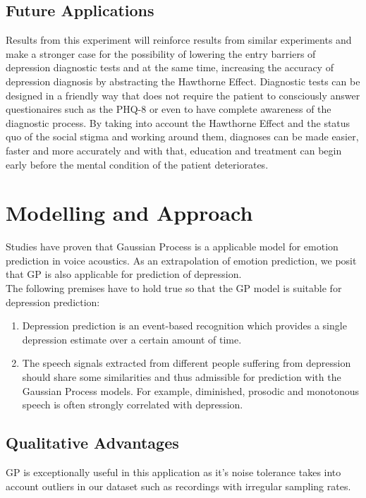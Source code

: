 \documentclass{article}
\begin{document}
	\subsection{Future Applications}
	Results from this experiment will reinforce results from similar experiments and make a stronger case for the possibility of lowering the entry barriers of depression diagnostic tests and at the same time, increasing the accuracy of depression diagnosis by abstracting the Hawthorne Effect. 
	Diagnostic tests can be designed in a friendly way that does not require the patient to consciously answer questionaires such as the PHQ-8 or even to have complete awareness of the diagnostic process. 
	By taking into account the Hawthorne Effect and the status quo of the social stigma and working around them, diagnoses can be made easier, faster and more accurately and with that, education and treatment can begin early before the mental condition of the patient deteriorates.
	
	\section{Modelling and Approach}
	Studies have proven that Gaussian Process is a applicable model for emotion prediction in voice acoustics. As an extrapolation of emotion prediction, we posit that GP is also applicable for prediction of depression. \\	
	
	The following premises have to hold true so that the GP model is suitable for depression prediction:
	\begin{enumerate}
		\item Depression prediction is an event-based recognition which provides a single depression estimate over a certain amount of time. \cite{Valstar2016}
		\item The speech signals extracted from different people suffering from depression should share some similarities and thus admissible for prediction with the Gaussian Process models. 
		For example, diminished, prosodic and monotonous speech is often strongly correlated with depression. \cite{Cummins2015}
	\end{enumerate}

	\subsection{Qualitative Advantages}
	GP is exceptionally useful in this application as it's noise tolerance takes into account outliers in our dataset such as recordings with irregular sampling rates. \\
\end{document}
